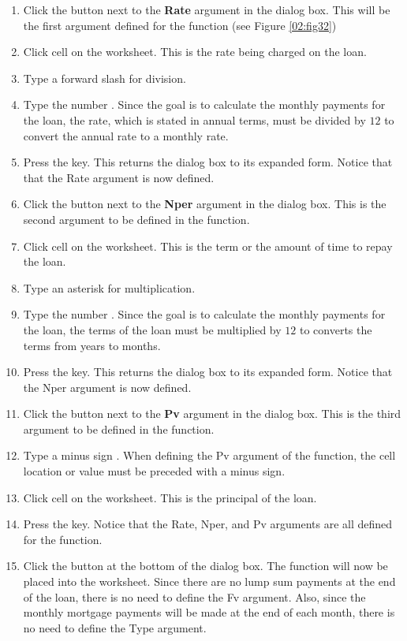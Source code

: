 \begin{enumerate}[resume]
	\item Click the  button next to the \textbf{Rate} argument in the  dialog box. This will be the first argument defined for the function (see Figure \ref{02:fig32})
	\item Click cell  on the worksheet. This is the rate being charged on the loan.
	\item Type a forward slash \fmtTyping{/} for division.
	\item Type the number . Since the goal is to calculate the monthly payments for the loan, the rate, which is stated in annual terms, must be divided by $ 12 $ to convert the annual rate to a monthly rate.
	\item Press the  key. This returns the  dialog box to its expanded form. Notice that that the Rate argument is now defined.
	\item Click the  button next to the \textbf{Nper} argument in the  dialog box. This is the second argument to be defined in the function.
	\item Click cell  on the worksheet. This is the term or the amount of time to repay the loan.
	\item Type an asterisk \fmtTyping{*} for multiplication.
	\item Type the number . Since the goal is to calculate the monthly payments for the loan, the terms of the loan must be multiplied by $ 12 $ to converts the terms from years to months.
	\item Press the  key. This returns the  dialog box to its expanded form. Notice that the Nper argument is now defined.
	\item Click the  button next to the \textbf{Pv} argument in the  dialog box. This is the third argument to be defined in the function.
	\item Type a minus sign \fmtTyping{-}. When defining the Pv argument of the  function, the cell location or value must be preceded with a minus sign.
	\item Click cell  on the worksheet. This is the principal of the loan.
	\item Press the  key. Notice that the Rate, Nper, and Pv arguments are all defined for the function.
	\item Click the  button at the bottom of the  dialog box. The function will now be placed into the worksheet. Since there are no lump sum payments at the end of the loan, there is no need to define the Fv argument. Also, since the monthly mortgage payments will be made at the end of each month, there is no need to define the Type argument.
\end{enumerate}

